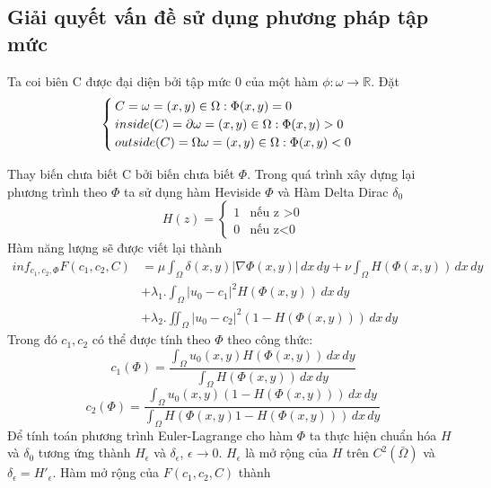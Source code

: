 \documentclass[12pt,oneside,a4]{report}
\begin{document}
\subsection{Giải quyết vấn đề sử dụng phương pháp tập mức}
Ta coi biên C được đại diện bởi tập mức 0 của một hàm $\phi: \omega \rightarrow \mathbb{R}$. Đặt 
\begin{equation}
\begin{cases}
 C= \omega ={(x,y)\in \Omega: \Phi(x,y)=0}\\
 inside(C)=\partial \omega ={(x,y)\in \Omega: \Phi(x,y)>0}\\
 outside(C)=\Omega \/ \omega ={(x,y)\in \Omega: \Phi(x,y)<0}
   \end{cases}
\end{equation}
 
Thay biến chưa biết C bởi biến chưa biết $\Phi$.  Trong quá trình xây dựng lại phương trình theo $\Phi$ ta sử dụng hàm Heviside $\Phi$ và Hàm Delta Dirac $\delta_0$
 \begin{equation}
 H(z)=
\begin{cases}
 1 & \text{nếu z >0}\\
0 & \text{nếu z<0}
   \end{cases}
\end{equation}
Hàm năng lượng sẽ được viết lại thành
\begin{equation}
\begin{split}
inf_{c_1,c_2,\Phi} F(c_1, c_2, C)&=\mu \int_{\Omega}\delta(x,y)|\nabla \Phi(x,y)|\,dx\,dy+\nu  \int_{\Omega}H( \Phi(x,y))\,dx\,dy \\ 
&+\lambda_1 .\int_{\Omega} |u_0-c_1|^2H(\Phi(x,y)) \,dx\,dy\\&+\lambda_2 .\iint_{\Omega} |u_0-c_2|^2(1-H(\Phi(x,y))) \,dx\,dy
\end{split}
\end{equation}
Trong đó $c_1, c_2$ có thể được tính theo $\Phi$ theo công thức:
\begin{equation}
c_1(\Phi)=\dfrac{\int_{\Omega}u_0(x,y)H(\Phi(x,y))\,dx \,dy}{\int_{\Omega}H(\Phi(x,y))\,dx\,dy}
\end{equation}
\begin{equation}
c_2(\Phi)=\dfrac{\int_{\Omega}u_0(x,y)(1-H(\Phi(x,y)))\,dx \,dy}{\int_{\Omega}H(\Phi(x,y)1-H(\Phi(x,y)))\,dx\,dy}
\end{equation}
Để tính toán phương trình Euler-Lagrange cho hàm $\Phi$ ta thực hiện chuẩn hóa $H$ và $\delta_0$ tương ứng thành  $H_{\epsilon}$ và $\delta_{\epsilon}$, $\epsilon \rightarrow 0$. $H_{\epsilon}$ là mở rộng của $H$ trên $C^2(\bar{\Omega})$ và $\delta_{\epsilon}=H'_{\epsilon}$. Hàm mở rộng của $F(c_1,c_2,C)$ thành
\end{document}
